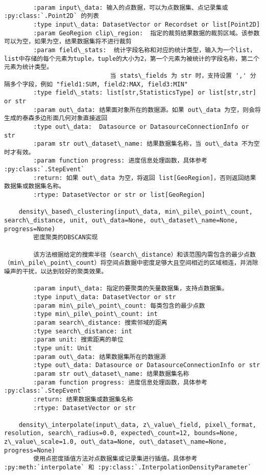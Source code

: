 \documentclass[11pt]{article}
\begin{document}
\begin{Verbatim}[commandchars=\\\{\}]
        
        :param input\_data: 输入的点数据，可以为点数据集、点记录集或 :py:class:`.Point2D` 的列表
        :type input\_data: DatasetVector or Recordset or list[Point2D]
        :param GeoRegion clip\_region:  指定的裁剪结果数据的裁剪区域。该参数可以为空，如果为空，结果数据集将不进行裁剪
        :param field\_stats:  统计字段名称和对应的统计类型，输入为一个list，list中存储的每个元素为tuple，tuple的大小为2，第一个元素为被统计的字段名称，第二个元素为统计类型。
                             当 stats\_fields 为 str 时，支持设置 ',' 分隔多个字段，例如 "field1:SUM, field2:MAX, field3:MIN"
        :type field\_stats: list[str,StatisticsType] or list[str,str] or str
        :param out\_data: 结果面对象所在的数据源。如果 out\_data 为空，则会将生成的泰森多边形面几何对象直接返回
        :type out\_data:  Datasource or DatasourceConnectionInfo or str
        :param str out\_dataset\_name: 结果数据集名称，当 out\_data 不为空时才有效。
        :param function progress: 进度信息处理函数，具体参考 :py:class:`.StepEvent`
        :return: 如果 out\_data 为空，将返回 list[GeoRegion]，否则返回结果数据集或数据集名称。
        :rtype: DatasetVector or str or list[GeoRegion]
    
    density\_based\_clustering(input\_data, min\_pile\_point\_count, search\_distance, unit, out\_data=None, out\_dataset\_name=None, progress=None)
        密度聚类的DBSCAN实现
        
        该方法根据给定的搜索半径（search\_distance）和该范围内需包含的最少点数（min\_pile\_point\_count）将空间点数据中密度足够大且空间相近的区域相连，并消除噪声的干扰，以达到较好的聚类效果。
        
        :param input\_data: 指定的要聚类的矢量数据集，支持点数据集。
        :type input\_data: DatasetVector or str
        :param min\_pile\_point\_count: 每类包含的最少点数
        :type min\_pile\_point\_count: int
        :param search\_distance: 搜索邻域的距离
        :type search\_distance: int
        :param unit: 搜索距离的单位
        :type unit: Unit
        :param out\_data: 结果数据集所在的数据源
        :type out\_data: Datasource or DatasourceConnectionInfo or str
        :param str out\_dataset\_name: 结果数据集名称
        :param function progress: 进度信息处理函数，具体参考 :py:class:`.StepEvent`
        :return: 结果数据集或数据集名称
        :rtype: DatasetVector or str
    
    density\_interpolate(input\_data, z\_value\_field, pixel\_format, resolution, search\_radius=0.0, expected\_count=12, bounds=None, z\_value\_scale=1.0, out\_data=None, out\_dataset\_name=None, progress=None)
        使用点密度插值方法对点数据集或记录集进行插值。具体参考 :py:meth:`interpolate` 和 :py:class:`.InterpolationDensityParameter`
        

\end{Verbatim}
\end{document}
